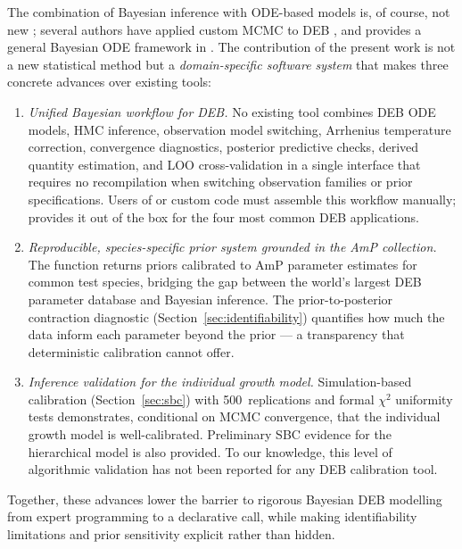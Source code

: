 \documentclass[article,shortnames]{jss}
\begin{document}
The combination of Bayesian inference with ODE-based models is, of
course, not new \citep{GelmanBDA2013}; several authors have applied
custom MCMC to DEB \citep{JohnsonDEB2015}, and 
\citep{deBInfer2017} provides a general Bayesian ODE framework in
.  The contribution of the present work is not a new
statistical method but a \emph{domain-specific software
system} that makes three concrete advances over existing tools:
\begin{enumerate}
  \item \emph{Unified Bayesian workflow for DEB.}  No existing tool
    combines DEB ODE models, HMC inference, observation model
    switching, Arrhenius temperature correction, convergence
    diagnostics, posterior predictive checks, derived quantity
    estimation, and LOO cross-validation in a single
     interface that requires no recompilation when
    switching observation families or prior specifications.  Users of
     or custom  code must assemble
    this workflow manually;  provides it
    out of the box for the four most common DEB applications.
  \item \emph{Reproducible, species-specific prior system grounded
    in the AmP collection.}  The function 
    returns priors calibrated to AmP parameter estimates
    \citep{MarquesAmP2018} for common test species, bridging the
    gap between the world's largest DEB parameter database and
    Bayesian inference.  The prior-to-posterior contraction
    diagnostic (Section~\ref{sec:identifiability}) quantifies
    how much the data inform each parameter beyond the prior ---
    a transparency that deterministic calibration cannot offer.
  \item \emph{Inference validation for the individual growth model.}
    Simulation-based calibration
    (Section~\ref{sec:sbc}) with 500~replications and formal
    $\chi^2$ uniformity tests demonstrates, conditional on MCMC
    convergence, that the individual growth model is well-calibrated.
    Preliminary SBC evidence for the hierarchical model is also
    provided.  To our knowledge, this level of algorithmic
    validation has not been reported for any DEB calibration tool.
\end{enumerate}
Together, these advances lower the barrier to rigorous Bayesian DEB
modelling from expert  programming to a declarative
 call, while making identifiability limitations and
prior sensitivity explicit rather than hidden.
\end{document}
